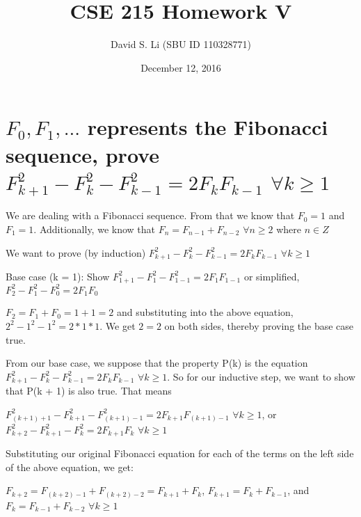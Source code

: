 \documentclass{article}
\title{CSE 215 Homework V}
\author{David S. Li (SBU ID 110328771)}
\date{December 12, 2016}
\begin{document}
\maketitle

\section{$F_{0}, F_{1}, ...$ represents the Fibonacci sequence, prove $F_{k + 1}^{2} - F_{k}^{2} - F_{k - 1}^{2} = 2F_{k}F_{k - 1}$ $\forall k \geq 1$}

We are dealing with a Fibonacci sequence.  From that we know that $F_{0} = 1$ and $F_{1} = 1$.  Additionally, we know that $F_{n} = F_{n - 1} + F_{n - 2}$ $\forall n \geq 2$ where $n \in Z$ \par\vspace{0.5cm}

\noindent We want to prove (by induction) $F_{k + 1}^{2} - F_{k}^{2} - F_{k - 1}^{2} = 2F_{k}F_{k - 1}$ $\forall k \geq 1$ \par\vspace{0.5cm}

\noindent Base case (k = 1):  Show $F_{1 + 1}^{2} - F_{1}^{2} - F_{1 - 1}^{2} = 2F_{1}F_{1 - 1}$ or simplified, $F_{2}^{2} - F_{1}^{2} - F_{0}^{2} = 2F_{1}F_{0}$
\par\noindent
$F_{2} = F_{1} + F_{0} = 1 + 1 = 2$ and substituting into the above equation, $2^{2} - 1^{2} - 1^{2} = 2 * 1 * 1$.  We get $2 = 2$ on both sides, thereby proving the base case true. \par\vspace{0.5cm}

\noindent From our base case, we suppose that the property P(k) is the equation $F_{k + 1}^{2} - F_{k}^{2} - F_{k - 1}^{2} = 2F_{k}F_{k - 1}$ $\forall k \geq 1$.  So for our inductive step, we want to show that P(k + 1) is also true.  That means \par\noindent $F_{(k + 1) + 1}^{2} - F_{k + 1}^{2} - F_{(k + 1) - 1}^{2} = 2F_{k + 1}F_{(k + 1) - 1}$ $\forall k \geq 1$, or $F_{k + 2}^{2} - F_{k + 1}^{2} - F_{k}^{2} = 2F_{k + 1}F_{k}$ $\forall k \geq 1$ \par\vspace{0.5cm}

\noindent Substituting our original Fibonacci equation for each of the terms on the left side of the above equation, we get: \par\noindent
$F_{k + 2} = F_{(k + 2) - 1} + F_{(k + 2) - 2} = F_{k + 1} + F_{k}$, $F_{k + 1} = F_{k} + F_{k - 1}$, and $F_{k} = F_{k - 1} + F_{k - 2}$ $\forall k \geq 1$ \par\vspace{0.5cm}
\end{document}
